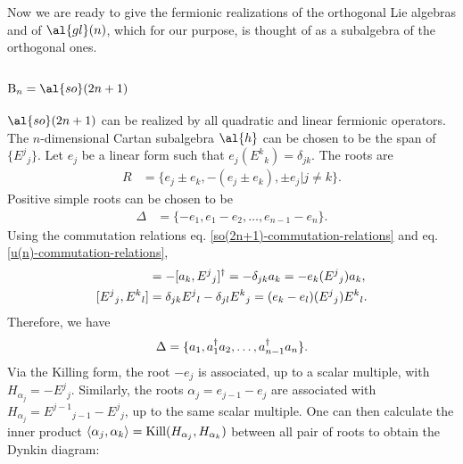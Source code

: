 Now we are ready to give the fermionic realizations of the orthogonal Lie algebras and of $\al{gl}(n)$, which for our purpose, is thought of as a subalgebra of the orthogonal ones.

\subsubsection{$\text{B}_n = \al{so}(2n+1)$}
$\al{so}(2n+1)$ can be realized by all quadratic and linear fermionic operators.
The $n$-dimensional Cartan subalgebra $\al{h}$ can be chosen to be the span of $\{E^j{}_j\}$.
Let $e_j$ be a linear form such that $e_j (E^k{}_k) = \delta_{jk}$. The roots are
\begin{align}
	R &= \{ e_j \pm e_k, -(e_j \pm e_k), \pm e_j |j \neq k \}.
\end{align}
Positive simple roots can be chosen to be
\begin{align}
	\Delta &= \{ -e_1, e_1 - e_2, \dots, e_{n-1} - e_n \}.
\end{align}
Using the commutation relations eq. \eqref{so(2n+1)-commutation-relations} and eq. \eqref{u(n)-commutation-relations},
\begin{align}
[E^j{}_j, a_k] &= -[a_k, E^j{_j}]\dgg = -\delta_{jk} a_k = -e_k(E^j{}_j) a_k, \\
[E^j{}_j, E^k{}_l] &= \delta_{jk} E^j{}_l - \delta_{jl} E^k{}_j = (e_k - e_l) (E^j{}_j) E^k{}_l.
\end{align}
Therefore, we have
\begin{align}
	\Delta = \{ a_1, a_1^{\dagger} a_2, \dots, a_{n-1}^{\dagger} a_n \}.
\end{align}
Via the Killing form, the root $-e_j$ is associated, up to a scalar multiple, with $H_{\alpha_j} = -E^j{}_j$. Similarly, the roots $\alpha_j = e_{j-1} - e_j$ are associated with $H_{\alpha_j} = E^{j-1}{}_{j-1} - E^j{}_j$, up to the same scalar multiple. One can then calculate the inner product $\braket{\alpha_j,\alpha_k} = \text{Kill}(H_{\alpha_j},H_{\alpha_k})$ between all pair of roots to obtain the Dynkin diagram:
\begin{center}
\end{center}

